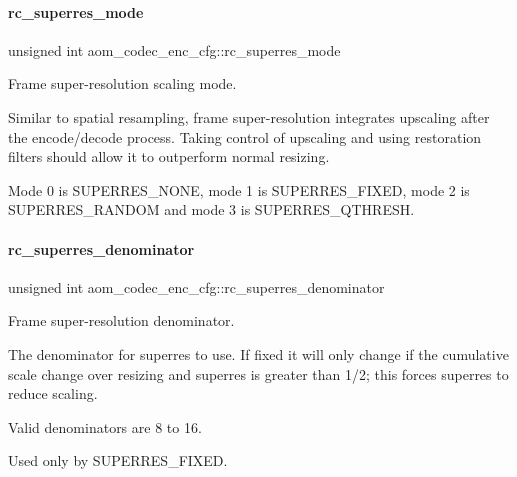 \paragraph{\texorpdfstring{rc\+\_\+superres\+\_\+mode}{rc\_superres\_mode}}
{\footnotesize\ttfamily unsigned int aom\+\_\+codec\+\_\+enc\+\_\+cfg\+::rc\+\_\+superres\+\_\+mode}



Frame super-\/resolution scaling mode. 

Similar to spatial resampling, frame super-\/resolution integrates upscaling after the encode/decode process. Taking control of upscaling and using restoration filters should allow it to outperform normal resizing.

Mode 0 is S\+U\+P\+E\+R\+R\+E\+S\+\_\+\+N\+O\+NE, mode 1 is S\+U\+P\+E\+R\+R\+E\+S\+\_\+\+F\+I\+X\+ED, mode 2 is S\+U\+P\+E\+R\+R\+E\+S\+\_\+\+R\+A\+N\+D\+OM and mode 3 is S\+U\+P\+E\+R\+R\+E\+S\+\_\+\+Q\+T\+H\+R\+E\+SH. \mbox{\label{structaom__codec__enc__cfg_a9217f81f33c62161df9d94e42f2b77c6}} 
\paragraph{\texorpdfstring{rc\+\_\+superres\+\_\+denominator}{rc\_superres\_denominator}}
{\footnotesize\ttfamily unsigned int aom\+\_\+codec\+\_\+enc\+\_\+cfg\+::rc\+\_\+superres\+\_\+denominator}



Frame super-\/resolution denominator. 

The denominator for superres to use. If fixed it will only change if the cumulative scale change over resizing and superres is greater than 1/2; this forces superres to reduce scaling.

Valid denominators are 8 to 16.

Used only by S\+U\+P\+E\+R\+R\+E\+S\+\_\+\+F\+I\+X\+ED. \mbox{\label{structaom__codec__enc__cfg_a4b5ed538fedccae4805fec4a58187fa7}} 
